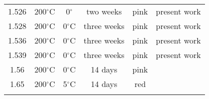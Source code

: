 {\begin{table}
\begin{center}
\begin{tabular}{||c|c|c|c|c|c||}
1.526 & 200$^{\circ}$C  & 0$^{\circ}$ & two weeks & pink & present work\\ 	%
1.528 & 200$^{\circ}$C  & 0$^{\circ}$C  & three weeks & pink & present work \\ 	%
1.536 & 200$^{\circ}$C & 0$^{\circ}$C  & three weeks & pink & present work \\ 	%
1.539 & 200$^{\circ}$C  & 0$^{\circ}$C  & three weeks & pink  & present work  \\ 	%
1.56 & 200$^{\circ}$C & 0$^{\circ}$C  & 14 days & pink & \cite{J140,timp83}\\ 
1.65 & 200$^{\circ}$C  & 5$^{\circ}$C & 14 days & red & \cite{J140,timp83}\\ 
& & & & & \\ 
\hline
\end{tabular}
\end{center}
\end{table}
}

{\newpage
\clearpage
\samepage \begin{figure}\vspace{20cm}

\label{stixr}
\end{figure}
}

{\newpage
\clearpage
\samepage \begin{figure}\vspace{20cm}

\label{hydxrd}
\end{figure}
}

{\newpage
\clearpage
\samepage \begin{figure}\vspace{19cm}

\label{csbixray}
\end{figure}
}

{\newpage
\clearpage
\samepage \begin{figure}\vspace{7.5in}

\label{ramfig}
\end{figure}
}

{\newpage
\clearpage
\samepage \begin{figure}\vspace{20cm}

\label{14cneut}
\end{figure}
}

{\newpage
\clearpage
\samepage \begin{figure}\vspace{20cm}

\label{6bneut}
\end{figure}
}

